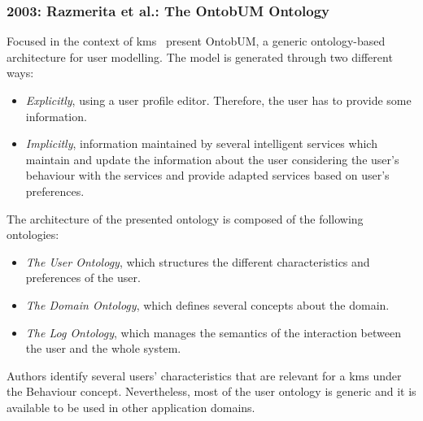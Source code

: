 \subsubsection{2003: Razmerita et al.: The OntobUM Ontology}
\label{sec:razmerita2003ontology}

Focused in the context of \ac{kms}~\citet{razmerita_ontology_based_2003} present
OntobUM, a generic ontology-based architecture for user modelling. The model is 
generated through two different ways:

\begin{itemize}
  \item \textit{Explicitly}, using a user profile editor. Therefore, the user has to 
  provide some information.
  \item \textit{Implicitly}, information maintained by several intelligent 
  services which maintain and update the information about the user considering 
  the user's behaviour with the services and provide adapted services based on 
  user's preferences.
\end{itemize}

The architecture of the presented ontology is composed of the following ontologies:

\begin{itemize}
  \item \textit{The User Ontology}, which structures the different characteristics
  and preferences of the user.
  \item \textit{The Domain Ontology}, which defines several concepts about the
  domain.
  \item \textit{The Log Ontology}, which manages the semantics of the interaction 
  between the user and the whole system.
\end{itemize}

Authors identify several users' characteristics that are relevant for a \ac{kms} 
under the Behaviour concept. Nevertheless, most of the user ontology is 
generic and it is available to be used in other application domains. 

